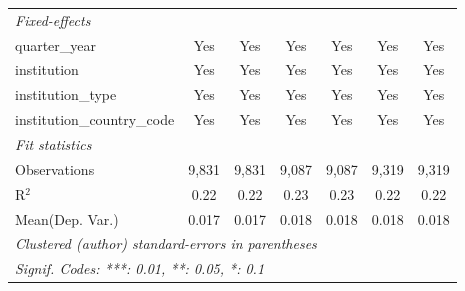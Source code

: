 \begin{tabular}{lcccccc}
   \emph{Fixed-effects}\\
   quarter\_year                      & Yes     & Yes      & Yes     & Yes      & Yes     & Yes\\  
   institution                        & Yes     & Yes      & Yes     & Yes      & Yes     & Yes\\  
   institution\_type                  & Yes     & Yes      & Yes     & Yes      & Yes     & Yes\\  
   institution\_country\_code         & Yes     & Yes      & Yes     & Yes      & Yes     & Yes\\  
   \midrule
   \emph{Fit statistics}\\
   Observations                       & 9,831   & 9,831    & 9,087   & 9,087    & 9,319   & 9,319\\  
   R$^2$                              & 0.22    & 0.22     & 0.23    & 0.23     & 0.22    & 0.22\\  
Mean(Dep. Var.) & 0.017 & 0.017 & 0.018 & 0.018 & 0.018 & 0.018 \\
   \midrule \midrule
   \multicolumn{7}{l}{\emph{Clustered (author) standard-errors in parentheses}}\\
   \multicolumn{7}{l}{\emph{Signif. Codes: ***: 0.01, **: 0.05, *: 0.1}}\\
\end{tabular}
\par\endgroup

